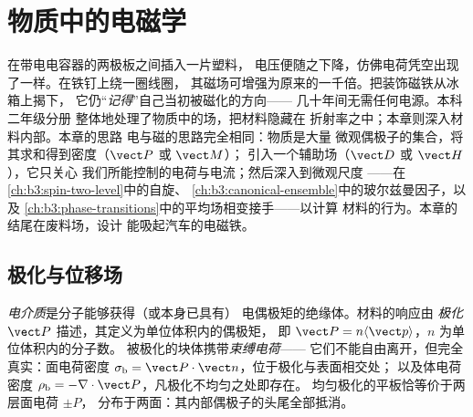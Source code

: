 \chapter{物质中的电磁学}\label{ch:b3:electromagnetism-in-matter}


在带电电容器的两极板之间插入一片塑料，
电压便随之下降，仿佛电荷凭空出现了一样。在铁钉上绕一圈线圈，
其磁场可增强为原来的一千倍。把装饰磁铁从冰箱上揭下，
它仍“\emph{记得}”自己当初被磁化的方向——
几十年间无需任何电源。本科二年级分册
整体地处理了物质中的场，把材料隐藏在
折射率之中；本章则深入材料内部。本章的思路
电与磁的思路完全相同：物质是大量
微观偶极子的集合，将其求和得到密度（$\vect P$ 或 $\vect M$）；
引入一个辅助场（$\vect D$ 或 $\vect H$），它只关心
我们所能控制的电荷与电流；然后深入到微观尺度
——在\cref{ch:b3:spin-two-level}中的自旋、
\cref{ch:b3:canonical-ensemble}中的玻尔兹曼因子，以及
\cref{ch:b3:phase-transitions}中的平均场相变接手——以计算
材料的行为。本章的结尾在废料场，设计
能吸起汽车的电磁铁。

\section{极化与位移场}

\begin{definition}[极化与束缚电荷]\label{def:b3:electromagnetism-in-matter:polarisation}
\emph{电介质}是分子能够获得（或本身已具有）
电偶极矩的绝缘体。材料的响应由
\emph{极化} $\vect P$ 描述，其定义为单位体积内的偶极矩，
即 $\vect P = n\langle\vect p\rangle$，$n$ 为单位体积内的分子数。
被极化的块体携带\emph{束缚电荷}——
它们不能自由离开，但完全真实：面电荷密度
$\sigma_{\text{b}} = \vect P\cdot\vect n$，位于极化与表面相交处；
以及体电荷密度 $\rho_{\text{b}} =
-\nabla\cdot\vect P$，凡极化不均匀之处即存在。
均匀极化的平板恰等价于两层面电荷 $\pm P$，
分布于两面：其内部偶极子的头尾全部抵消。
\end{definition}

